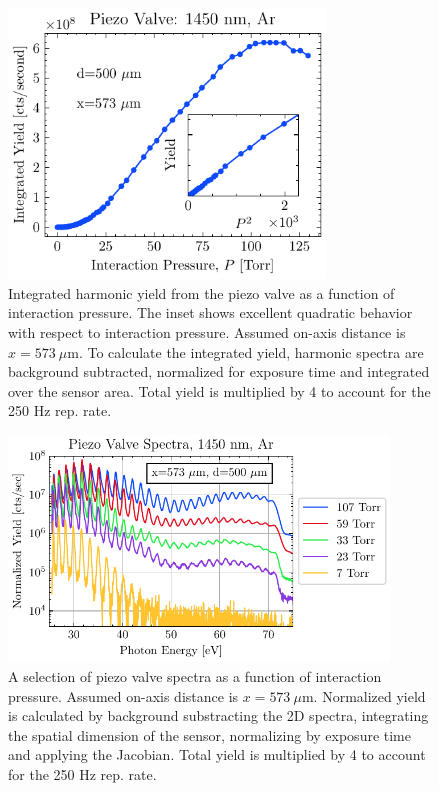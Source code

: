 \begin{figure}
	\centering
	\includegraphics[width=0.75\textwidth]{figures/chap3/piezovalve_pscan.pdf}
	\caption{Integrated harmonic yield from the piezo valve as a function of interaction pressure. The inset shows excellent quadratic behavior with respect to interaction pressure. Assumed on-axis distance is $x = 573 \ \mu \textrm{m}$. To calculate the integrated yield, harmonic spectra are background subtracted, normalized for exposure time and integrated over the sensor area. Total yield is multiplied by 4 to account for the 250 Hz rep. rate.}
	\label{fig:piezovalve_pscan}
\end{figure}

\begin{figure}
	\centering
	\includegraphics[width=0.9\textwidth]{figures/chap3/piezovalve_spectra.pdf}
	\caption{A selection of piezo valve spectra as a function of interaction pressure. Assumed on-axis distance is $x = 573 \ \mu \textrm{m}$. Normalized yield is calculated by background substracting the 2D spectra, integrating the spatial dimension of the sensor, normalizing by exposure time and applying the Jacobian. Total yield is multiplied by 4 to account for the 250 Hz rep. rate.}
	\label{fig:piezovalve_spectra}
\end{figure}

